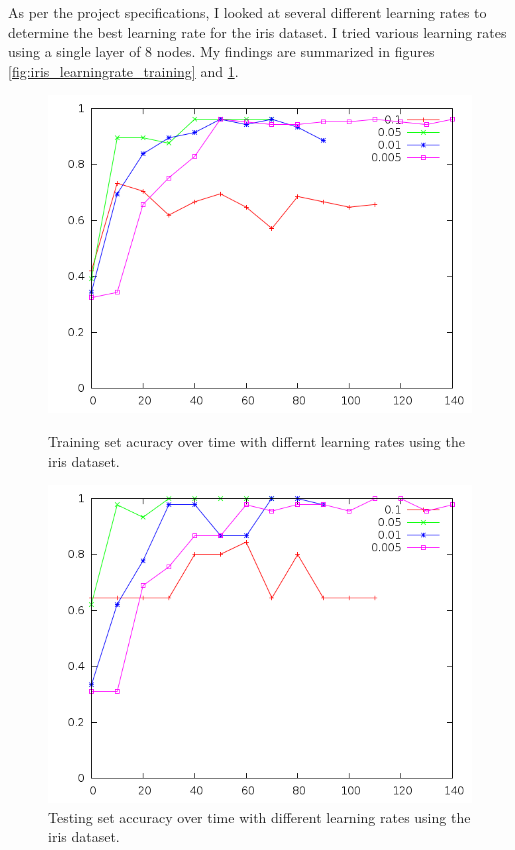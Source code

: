 \documentclass[12pt]{article}
\begin{document}
As per the project specifications, I looked at several different learning rates
to determine the best learning rate for the iris dataset. I tried various
learning rates using a single layer of 8 nodes. My findings are summarized in
figures \ref{fig:iris_learningrate_training} and
\ref{fig:iris_learningrate_testing}.
\begin{figure}[!ht]
    \centering
    \begin{minipage}[b]{0.45\linewidth}
        \includegraphics[width=1.0\textwidth]{iris-learningrate-training}
        \caption{Training set acuracy over time with differnt learning rates using the iris dataset.}
        \label{fig:iris_learningrate_training}
    \end{minipage}
    \quad
    \begin{minipage}[b]{0.45\linewidth}
        \includegraphics[width=1.0\textwidth]{iris-learningrate-testing}
        \caption{Testing set accuracy over time with different learning rates using the iris dataset.}
        \label{fig:iris_learningrate_testing}
    \end{minipage}
\end{figure}
\end{document}
